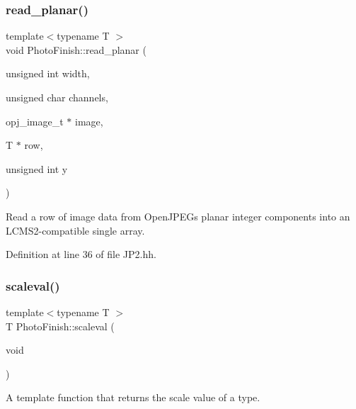 \subsubsection{\texorpdfstring{read\+\_\+planar()}{read\_planar()}}
{\footnotesize\ttfamily template$<$typename T $>$ \\
void Photo\+Finish\+::read\+\_\+planar (\begin{DoxyParamCaption}\item[{unsigned int}]{width,  }\item[{unsigned char}]{channels,  }\item[{opj\+\_\+image\+\_\+t $\ast$}]{image,  }\item[{T $\ast$}]{row,  }\item[{unsigned int}]{y }\end{DoxyParamCaption})\hspace{0.3cm}{\ttfamily [inline]}}



Read a row of image data from Open\+J\+P\+EG\textquotesingle{}s planar integer components into an L\+C\+M\+S2-\/compatible single array. 



Definition at line 36 of file J\+P2.\+hh.

\mbox{\label{namespace_photo_finish_a1bfb8180736f3b2786f47361d7586f2c}} 
\subsubsection{\texorpdfstring{scaleval()}{scaleval()}}
{\footnotesize\ttfamily template$<$typename T $>$ \\
T Photo\+Finish\+::scaleval (\begin{DoxyParamCaption}\item[{void}]{ }\end{DoxyParamCaption})}



A template function that returns the \textquotesingle{}scale\textquotesingle{} value of a type. 

\mbox{\label{namespace_photo_finish_abfdbadb0978c56b817c27939adc53c23}} 
